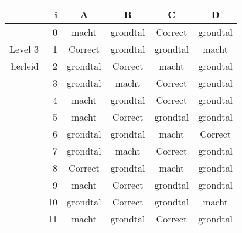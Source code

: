 \begin{tabular}{ rr| c|c|c|c}\hline\hline
     & i & \textbf{A} & \textbf{B} & \textbf{C} & \textbf{D}\\\hline

&0&macht&grondtal&Correct\cellcolor[gray]{0.6}&grondtal\\
Level 3 & 1&Correct\cellcolor[gray]{0.6}&grondtal&grondtal&macht\\
herleid &2&grondtal&Correct\cellcolor[gray]{0.6}&macht&grondtal\\
&3&grondtal&macht&Correct\cellcolor[gray]{0.6}&grondtal\\
&4&macht&grondtal&Correct\cellcolor[gray]{0.6}&grondtal\\
&5&macht&Correct\cellcolor[gray]{0.6}&grondtal&grondtal\\
&6&grondtal&grondtal&macht&Correct\cellcolor[gray]{0.6}\\
&7&grondtal&macht&Correct\cellcolor[gray]{0.6}&grondtal\\
&8&Correct\cellcolor[gray]{0.6}&grondtal&macht&grondtal\\
&9&macht&Correct\cellcolor[gray]{0.6}&grondtal&grondtal\\
&10&grondtal&Correct\cellcolor[gray]{0.6}&grondtal&macht\\
&11&macht&grondtal&Correct\cellcolor[gray]{0.6}&grondtal\\
\hline\end{tabular}\par\ \newline

